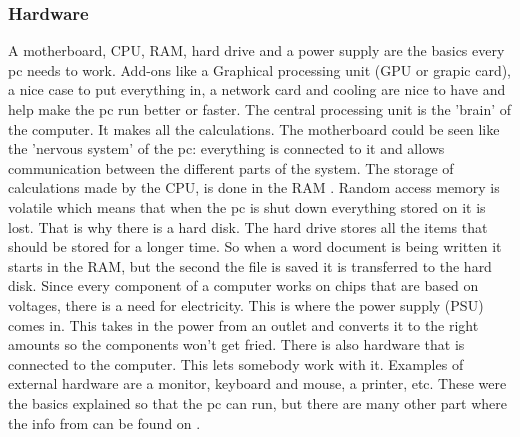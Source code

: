 \subsubsection{Hardware} \label{hardware}
A motherboard, CPU, RAM, hard drive and a power supply are the basics every pc needs to work.
Add-ons like a Graphical processing unit (GPU or grapic card), a nice case to put everything in, a network card and cooling are nice to have and help make the pc run better or faster.
The central processing unit is the 'brain' of the computer. It makes all the calculations.
The motherboard could be seen like the 'nervous system' of the pc: everything is connected to it and allows communication between the different parts of the system.
The storage of calculations made by the CPU, is done in the RAM . Random access memory is volatile which means that when the pc is shut down everything stored on it is lost.
That is why there is a hard disk. The hard drive stores all the items that should be stored for a longer time. So when a word document is being written it starts in the RAM, but the second the file is saved it is transferred to the hard disk.
Since every component of a computer works on chips that are based on voltages, there is a need for electricity. This is where the power supply (PSU) comes in. This takes in the power from an outlet and converts it to the right amounts so the components won't get fried.
There is also hardware that is connected to the computer. This lets somebody work with it. Examples of external hardware are a monitor, keyboard and mouse, a printer, etc.
These were the basics explained so that the pc can run, but there are many other part where the info from can be found on \cite[https://edu.Fcfglobal.org/en/computerbasics/]{ComputerBasics}.

